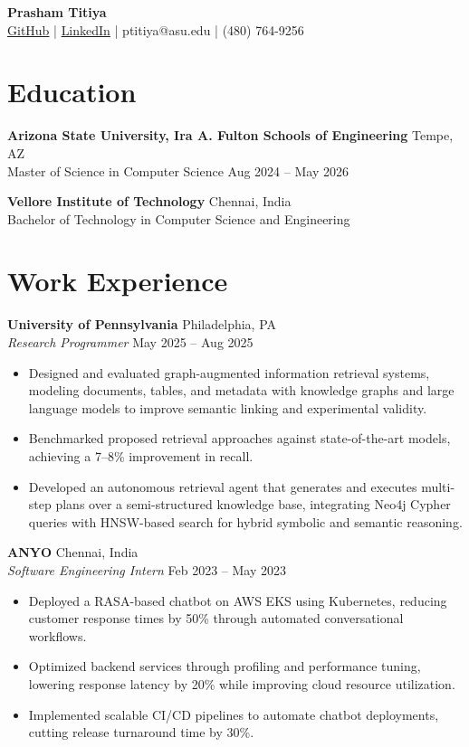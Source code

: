 \documentclass[10pt]{article}
\begin{document}
\begin{center}
{\Large \textbf{Prasham Titiya}} \\
\href{https://github.com/prasham1515}{GitHub} \;|\; \href{https://www.linkedin.com/in/prasham-titiya}{LinkedIn} \;|\; ptitiya@asu.edu \;|\; (480) 764-9256
\end{center}

\vspace{-6pt}

\section*{Education}

\noindent \textbf{Arizona State University, Ira A. Fulton Schools of Engineering} \hfill Tempe, AZ \\
Master of Science in Computer Science \hfill Aug 2024 -- May 2026

\noindent \textbf{Vellore Institute of Technology} \hfill Chennai, India \\
Bachelor of Technology in Computer Science and Engineering

\section*{Work Experience}

\noindent \textbf{University of Pennsylvania} \hfill Philadelphia, PA \\
\textit{Research Programmer} \hfill May 2025 -- Aug 2025
\begin{itemize}
  \item Designed and evaluated graph-augmented information retrieval systems, modeling documents, tables, and metadata with knowledge graphs and large language models to improve semantic linking and experimental validity.
  \item Benchmarked proposed retrieval approaches against state-of-the-art models, achieving a 7--8\% improvement in recall.
  \item Developed an autonomous retrieval agent that generates and executes multi-step plans over a semi-structured knowledge base, integrating Neo4j Cypher queries with HNSW-based search for hybrid symbolic and semantic reasoning.
\end{itemize}


\noindent \textbf{ANYO} \hfill Chennai, India \\
\textit{Software Engineering Intern} \hfill Feb 2023 -- May 2023
\begin{itemize}
  \item Deployed a RASA-based chatbot on AWS EKS using Kubernetes, reducing customer response times by 50\% through automated conversational workflows.
  \item Optimized backend services through profiling and performance tuning, lowering response latency by 20\% while improving cloud resource utilization.
  \item Implemented scalable CI/CD pipelines to automate chatbot deployments, cutting release turnaround time by 30\%.
\end{itemize}
\end{document}
